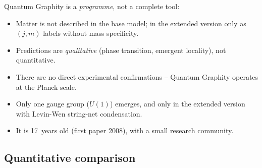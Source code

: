 Quantum Graphity is a \emph{programme}, not a complete tool:
\begin{itemize}[leftmargin=2em,itemsep=2pt,topsep=2pt]
  \item Matter is not described in the base model; in the extended
        version only as $(j, m)$ labels without mass specificity.
  \item Predictions are \emph{qualitative} (phase transition,
        emergent locality), not quantitative.
  \item There are no direct experimental confirmations -- Quantum
        Graphity operates at the Planck scale.
  \item Only one gauge group ($U(1)$) emerges, and only in the
        extended version with Levin-Wen string-net condensation.
  \item It is 17~years old (first paper 2008), with a small research
        community.
\end{itemize}

\subsection{Quantitative comparison}

\begin{center}
\renewcommand{\arraystretch}{1.4}
{\small
{}
}
\renewcommand{\arraystretch}{1.0}
\end{center}

